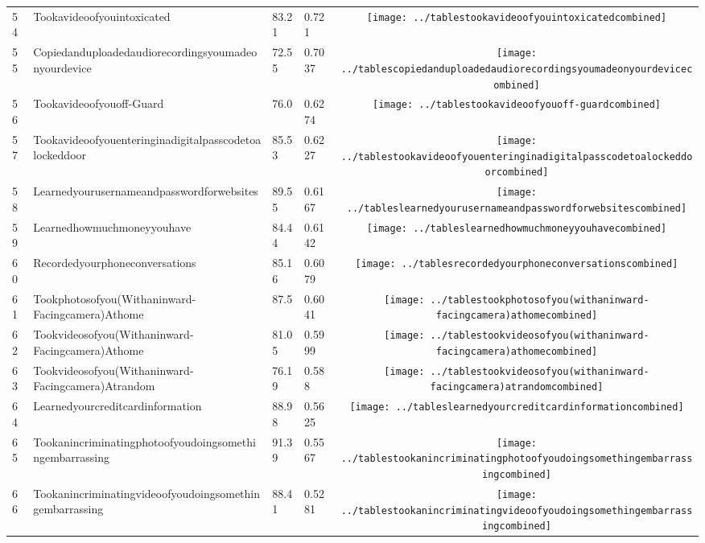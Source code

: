 \documentclass[a4paper,12pt]{article}
\begin{document}
\begin{longtable}{| p{0.5cm} | p{7cm} | p{1cm} |p{1cm} | c |}
54 & Tookavideoofyouintoxicated & 83.21 & 0.721&\texttt{[image: ../tablestookavideoofyouintoxicatedcombined]} \\ 
55 & Copiedanduploadedaudiorecordingsyoumadeonyourdevice & 72.55 & 0.7037&\texttt{[image: ../tablescopiedanduploadedaudiorecordingsyoumadeonyourdevicecombined]} \\ 
56 & Tookavideoofyouoff-Guard & 76.0 & 0.6274&\texttt{[image: ../tablestookavideoofyouoff-guardcombined]} \\ 
57 & Tookavideoofyouenteringinadigitalpasscodetoalockeddoor & 85.53 & 0.6227&\texttt{[image: ../tablestookavideoofyouenteringinadigitalpasscodetoalockeddoorcombined]} \\ 
58 & Learnedyourusernameandpasswordforwebsites & 89.55 & 0.6167&\texttt{[image: ../tableslearnedyourusernameandpasswordforwebsitescombined]} \\ 
59 & Learnedhowmuchmoneyyouhave & 84.44 & 0.6142&\texttt{[image: ../tableslearnedhowmuchmoneyyouhavecombined]} \\ 
60 & Recordedyourphoneconversations & 85.16 & 0.6079&\texttt{[image: ../tablesrecordedyourphoneconversationscombined]} \\ 
61 & Tookphotosofyou(Withaninward-Facingcamera)Athome & 87.5 & 0.6041&\texttt{[image: ../tablestookphotosofyou(withaninward-facingcamera)athomecombined]} \\ 
62 & Tookvideosofyou(Withaninward-Facingcamera)Athome & 81.05 & 0.5999&\texttt{[image: ../tablestookvideosofyou(withaninward-facingcamera)athomecombined]} \\ 
63 & Tookvideosofyou(Withaninward-Facingcamera)Atrandom & 76.19 & 0.588&\texttt{[image: ../tablestookvideosofyou(withaninward-facingcamera)atrandomcombined]} \\ 
64 & Learnedyourcreditcardinformation & 88.98 & 0.5625&\texttt{[image: ../tableslearnedyourcreditcardinformationcombined]} \\ 
65 & Tookanincriminatingphotoofyoudoingsomethingembarrassing & 91.39 & 0.5567&\texttt{[image: ../tablestookanincriminatingphotoofyoudoingsomethingembarrassingcombined]} \\ 
66 & Tookanincriminatingvideoofyoudoingsomethingembarrassing & 88.41 & 0.5281&\texttt{[image: ../tablestookanincriminatingvideoofyoudoingsomethingembarrassingcombined]} \\ 

\end{longtable}
\end{document}
